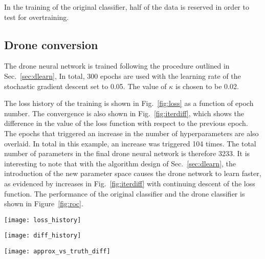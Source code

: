 In the training of the original classifier, half of the data is
reserved in order to test for overtraining.

\subsection{Drone conversion}

The drone neural network is trained following the procedure outlined in Sec.~\ref{sec:dlearn},
In total, 300 epochs are used with
the learning rate of the stochastic gradient descent set to 0.05.
The value of $\kappa$ is chosen to be 0.02.

The loss history of the training is shown in Fig.~\ref{fig:loss}
as a function of epoch number.
The convergence is also shown in Fig.~\ref{fig:iterdiff}, which shows
the difference in the value of the loss function with respect to the previous
epoch. The epochs that triggered an increase in the number of hyperparameters
are also overlaid.
In total in this example, an increase was triggered 104 times. The total number
of parameters in the final drone neural network is therefore 3233. It is interesting
to note that with the algorithm design of Sec.~\ref{sec:dlearn}, the introduction
of the new parameter space causes the drone network to learn faster, as evidenced by
increases in Fig.~\ref{fig:iterdiff} with continuing descent of the loss function.
%
The performance of the original classifier and the drone classifier is shown in Figure~\ref{fig:roc}.
\begin{figure*}[t]
\centering
\texttt{[image: loss\_history]}
\caption{\small 
Convergence of the loss function during the drone training.
}
\label{fig:loss}
\end{figure*}
\begin{figure*}[t]
\centering
\texttt{[image: diff\_history]}
\caption{\small 
Difference in the loss function with respect to the previous iteration. The green triangles
depict the epoch number in which the number of hyperperameters was increased.
}
\label{fig:iterdiff}
\end{figure*}
\begin{figure*}[t]
\centering
\texttt{[image: approx\_vs\_truth\_diff]}
\caption{\small 
Difference between the output response of the drone model with respect to
the original classifier for data points in the test sample.
}
\label{fig:diff}
\end{figure*}


